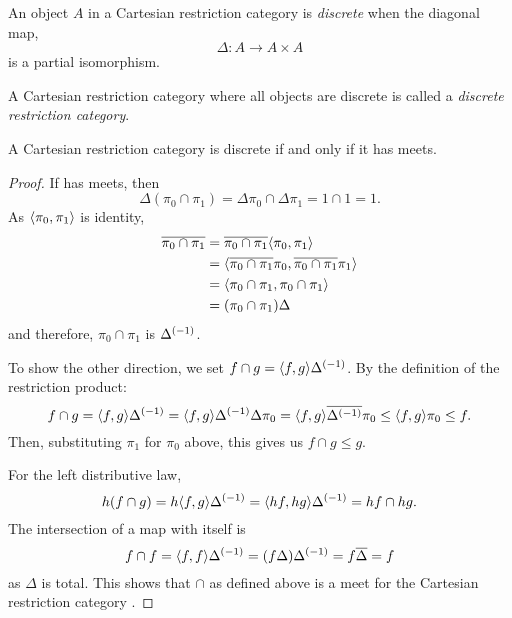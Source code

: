 \begin{definition}
  An object $A$ in a Cartesian restriction category is \emph{discrete}
  when the diagonal map,
  \[
    \Delta:A \to A \times A
  \]
  is a partial isomorphism.
\end{definition}

\begin{definition}\label{def:discrete_restriction_category}
  A  Cartesian restriction category where all objects are
  discrete is called a \emph{discrete restriction category}.
\end{definition}

\begin{theorem}\label{thm:a_crc_is_discrete_iff_it_has_meets}
  A Cartesian restriction category \X is discrete if and only if it has meets.
\end{theorem}
\begin{proof}
  If \X has meets, then
  \[
    \Delta(\pi_0 \cap \pi_1) = \Delta\pi_0 \cap \Delta\pi_1 = 1\cap 1 = 1.
  \]
  As $\langle\pi_0,\pi_1\rangle$ is identity,
  \begin{align*}
    \overline{\pi_0 \cap \pi_1} &= \overline{\pi_0 \cap \pi_1} \langle\pi_0, \pi_1\rangle \\
    &=\langle\overline{\pi_0 \cap \pi_1}\pi_0, \overline{\pi_0 \cap \pi_1}\pi_1\rangle\\
    &=\langle\pi_0 \cap \pi_1,\pi_0 \cap \pi_1\rangle\\
    &=(\pi_0 \cap \pi_1 )\Delta
  \end{align*}
  and therefore, $\pi_0 \cap \pi_1$ is ${\Delta}^{(-1)}$.

  To show the other direction, we set $f\cap g = \langle f,g\rangle{\Delta}^{(-1)}$.
  By the definition of the restriction product:
  \[
    f \cap g =  \langle f,g\rangle{\Delta}^{(-1)} =\langle f,g\rangle{\Delta}^{(-1)} \Delta \pi_0 =
      \langle f,g\rangle\overline{{\Delta}^{(-1)}}\pi_0 \le \langle f,g\rangle\pi_0 \le f.
  \]
  Then, substituting $\pi_1$ for $\pi_0$ above, this gives us $f \cap g \le g$.

  For the left distributive law,
  \[
    h(f \cap g) = h \langle f,g\rangle{\Delta}^{(-1)} =  \langle h f,h g\rangle{\Delta}^{(-1)} = h f \cap h g.
  \]
  The intersection of a map with itself is
  \[
    f\cap f = \langle f,f\rangle {\Delta}^{(-1)} = (f \Delta) {\Delta}^{(-1)} = f \overline{\Delta} = f
  \]
  as $\Delta$ is total. This shows that $\cap$ as defined above is a meet for the
  Cartesian restriction category \X.

\end{proof}


